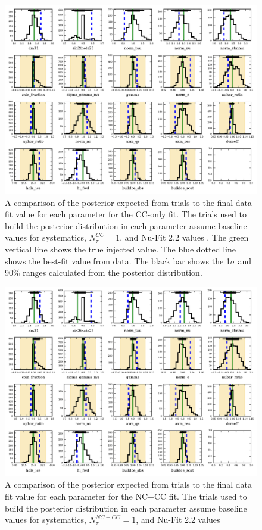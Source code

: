 \begin{figure}{}
	\centering \includegraphics[width=\textwidth]{cc_systematics.pdf}
	\caption{A comparison of the posterior expected from trials to the final data fit value for each parameter for the CC-only fit. The trials used to build the posterior distribution in each parameter assume baseline values for systematics, $N_\tau^{CC}=1$, and Nu-Fit 2.2 values \cite{NuFit_2.2}. The green vertical line shows the true injected value. The blue dotted line shows the best-fit value from data. The black bar shows the 1$\sigma$ and 90\% ranges calculated from the posterior distribution.}
	\label{fig:posteriors_cc}
\end{figure}

\begin{figure}{}
	\centering \includegraphics[width=\textwidth]{nc+cc_systematics.pdf}
	\caption{A comparison of the posterior expected from trials to the final data fit value for each parameter for the NC+CC fit. The trials used to build the posterior distribution in each parameter assume baseline values for systematics, $N_\tau^{NC+CC}=1$, and Nu-Fit 2.2 values \cite{NuFit_2.2}}
	\label{fig:posteriors_nc_cc}
\end{figure}

